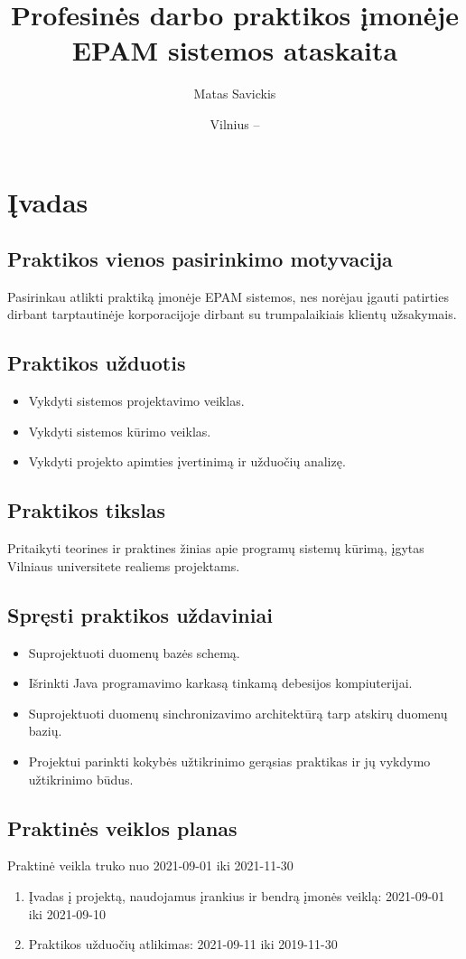 \documentclass{VUMIFPSkursinis}
\title{Profesinės darbo praktikos įmonėje EPAM sistemos ataskaita}
\author{Matas Savickis}
\date{Vilnius – \the\year}
\begin{document}
\maketitle
\addtocounter{page}{1}
\tableofcontents

\section{Įvadas}
	\subsection{Praktikos vienos pasirinkimo motyvacija}
		Pasirinkau atlikti praktiką įmonėje EPAM sistemos, nes norėjau įgauti patirties dirbant tarptautinėje
		korporacijoje dirbant su trumpalaikiais klientų užsakymais.
	\subsection{Praktikos užduotis}
		\begin{itemize}
			\item{Vykdyti sistemos projektavimo veiklas.}
			\item{Vykdyti sistemos kūrimo veiklas.}
			\item{Vykdyti projekto apimties įvertinimą ir užduočių analizę.}
		\end{itemize}

	\subsection{Praktikos tikslas}
		Pritaikyti teorines ir praktines žinias apie programų sistemų kūrimą, įgytas Vilniaus universitete realiems projektams.

	\subsection{Spręsti praktikos uždaviniai}
		\begin{itemize}
			\item{Suprojektuoti duomenų bazės schemą.}
			\item{Išrinkti Java programavimo karkasą tinkamą debesijos kompiuterijai.}
			\item{Suprojektuoti duomenų sinchronizavimo architektūrą tarp atskirų duomenų bazių.}
			\item{Projektui parinkti kokybės užtikrinimo gerąsias praktikas ir jų vykdymo užtikrinimo būdus.}	
		\end{itemize}
	\subsection{Praktinės veiklos planas}
		Praktinė veikla truko nuo 2021-09-01 iki 2021-11-30
		\begin{enumerate}
			\item{Įvadas į projektą, naudojamus įrankius ir bendrą įmonės veiklą: 2021-09-01 iki 2021-09-10}
			\item{Praktikos užduočių atlikimas: 2021-09-11 iki 2019-11-30}
		\end{enumerate}
\end{document}
